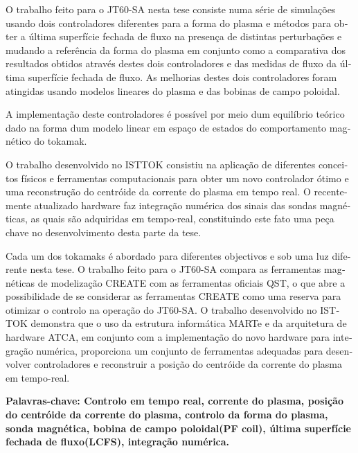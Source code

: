 \begin{otherlanguage}{portuguese}
O trabalho feito para o JT60-SA nesta tese consiste numa série de simulações usando dois controladores diferentes para a forma do plasma e métodos para obter a última superfície fechada de fluxo na presença de distintas perturbações e mudando a referência da forma do plasma  em conjunto como a comparativa dos resultados obtidos através destes dois controladores e  das medidas de fluxo da última superfície fechada de fluxo.  As melhorias destes dois controladores foram atingidas usando modelos lineares  do plasma e das bobinas de campo poloidal.\smallskip

A implementação deste controladores é  possível por meio dum equilíbrio teórico dado na forma dum modelo linear em espaço de estados do comportamento magnético do tokamak. \smallskip


O trabalho desenvolvido no ISTTOK consistiu na aplicação de diferentes conceitos físicos e ferramentas computacionais para obter um novo controlador ótimo e uma reconstrução do centróide da corrente do plasma em tempo real. O recentemente atualizado hardware faz integração numérica dos sinais das sondas magnéticas, as quais são adquiridas em tempo-real, constituindo este fato uma peça chave no desenvolvimento desta parte da tese. \smallskip


Cada um dos tokamaks é abordado para diferentes objectivos e sob uma luz diferente nesta tese. O trabalho feito para o JT60-SA compara as ferramentas magnéticas de modelização CREATE com as ferramentas oficiais QST, o que abre a possibilidade de se considerar as ferramentas CREATE como uma reserva para otimizar o controlo na operação do JT60-SA. O trabalho desenvolvido no ISTTOK demonstra que o uso da estrutura informática MARTe e da arquitetura de hardware ATCA, em conjunto com a implementação do novo hardware para integração numérica, proporciona um conjunto de ferramentas adequadas para desenvolver controladores e reconstruir a posição do centróide da corrente do plasma em tempo-real. \smallskip


\vfill
\textbf{ Palavras-chave: Controlo em tempo real, corrente do plasma, posição do centróide da corrente do plasma,   controlo da forma do plasma, sonda magnética, bobina de campo poloidal(PF coil), última superfície fechada de fluxo(LCFS), integração numérica.    } 

\end{otherlanguage}
\pagebreak
